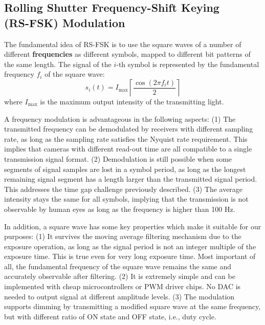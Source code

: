 \subsection{Rolling Shutter Frequency-Shift Keying \\(RS-FSK) Modulation }

The fundamental idea of RS-FSK is to use the square waves of a number of different \textbf{frequencies} as different symbols, mapped to different bit patterns of the same length. The signal of the $i$-th symbol is represented by the fundamental frequency $f_i$ of the square wave:
\begin{equation}
	s_i(t)= I_{\max} \left \lceil \frac{\cos (2 \pi f_i t)}{2} \right \rceil
\end{equation} where $I_{\max}$ is the maximum output intensity of the transmitting light. 

A frequency modulation is advantageous in the following aspects:
(1) The transmitted frequency can be demodulated by receivers with different sampling rate, as long as the sampling rate satisfies the Nyquist rate requirement. This implies that cameras with different read-out time are all compatible to a single transmission signal format.
(2) Demodulation is still possible when some segments of signal samples are lost in a symbol period, as long as the longest remaining signal segment has a length larger than the transmitted signal period. This addresses the time gap challenge previously described.
(3) The average intensity stays the same for all symbols, implying that the transmission is not observable by human eyes as long as the frequency is higher than 100 Hz. 

In addition, a square wave has some key properties which make it suitable for our purposes:
(1) It survives the moving average filtering mechanism due to the exposure operation, as long as the signal period is not an integer multiple of the exposure time. This is true even for very long exposure time. Most important of all, the fundamental frequency of the square wave remains the same and accurately observable after filtering.
(2) It is extremely simple and can be implemented with cheap microcontrollers or PWM driver chips. No DAC is needed to output signal at different amplitude levels.
(3) The modulation supports dimming by transmitting a modified square wave at the same frequency, but with different ratio of ON state and OFF state, i.e., duty cycle. 

